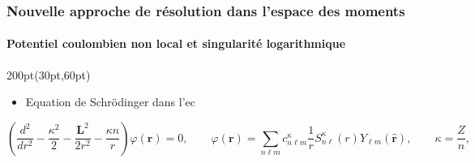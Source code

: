 \begin{frame}
 \frametitle{Nouvelle approche de r\'esolution dans l'espace des moments}
 \framesubtitle{Potentiel coulombien non local et singularit\'e logarithmique}
 






\begin{textblock*}{200pt}(30pt,60pt)
\footnotesize
\begin{itemize}
\item Equation de Schr\"odinger dans l'\acrshort{ec}
\end{itemize}
\begin{equation*}
 \left(\frac{d^2}{dr^2} - \frac{\kappa^2}{2} -\frac{\boldsymbol{L}^2}{2r^2}
   - \frac{\kappa n}{r}\right) \varphi (\boldsymbol{r}) = 0, 
\qquad \varphi(\boldsymbol{r}) = \sum_{n\ell m} c_{n\ell m}^\kappa \frac{1}{r}
 S_{n\ell}^\kappa (r) Y_{\ell m}({\boldsymbol{\hat{r}}}),
\qquad \kappa=\frac{Z}{n},\label{eqn:ss_config}
\end{equation*}

\end{textblock*}


\end{frame}
